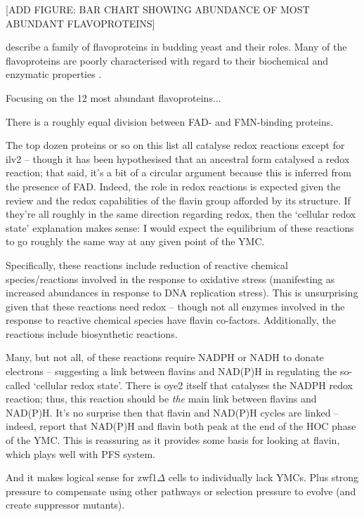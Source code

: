 [ADD FIGURE: BAR CHART SHOWING ABUNDANCE OF MOST ABUNDANT FLAVOPROTEINS]

\citet{gudipatiFlavoproteomeYeastSaccharomyces2014} describe a family of flavoproteins in budding yeast and their roles. %
Many of the flavoproteins are poorly characterised with regard to their biochemical and enzymatic properties \citep{kochStructureBiochemicalKinetic2017}.

Focusing on the 12 most abundant \citep{hoUnificationProteinAbundance2018} flavoproteins...

There is a roughly equal division between FAD- and FMN-binding proteins.

The top dozen proteins or so on this list all catalyse redox reactions except for ilv2 -- though it has been hypothesised that an ancestral form catalysed a redox reaction; that said, it's a bit of a circular argument because this is inferred from the presence of FAD.
Indeed, the role in redox reactions is expected given the review and the redox capabilities of the flavin group afforded by its structure.
If they're all roughly in the same direction regarding redox, then the `cellular redox state' explanation makes sense: I would expect the equilibrium of these reactions to go roughly the same way at any given point of the YMC.

Specifically, these reactions include reduction of reactive chemical species/reactions involved in the response to oxidative stress (manifesting as increased abundances in response to DNA replication stress).
This is unsurprising given that these reactions need redox -- though not all enzymes involved in the response to reactive chemical species have flavin co-factors.
Additionally, the reactions include biosynthetic reactions.

Many, but not all, of these reactions require NADPH or NADH to donate electrons -- suggesting a link between flavins and NAD(P)H in regulating the so-called `cellular redox state'.
There is oye2 itself that catalyses the NADPH redox reaction; thus, this reaction should be \emph{the} main link between flavins and NAD(P)H.
It's no surprise then that flavin and NAD(P)H cycles are linked -- indeed, \citet{murrayRedoxRegulationRespiring2011} report that NAD(P)H and flavin both peak at the end of the HOC phase of the YMC.
This is reassuring as it provides some basis for looking at flavin, which plays well with PFS system.

And it makes logical sense for zwf1$\Delta{}$ cells to individually lack YMCs. Plus strong pressure to compensate using other pathways or selection pressure to evolve (and create suppressor mutants).

